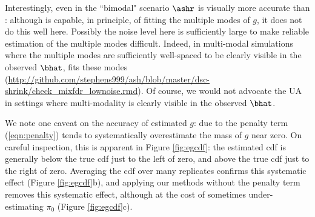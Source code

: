Interestingly, even in the ``bimodal" scenario $\ashr$ 
is visually more accurate than \mixfdr: although \mixfdr is capable, in principle, of fitting the multiple modes of $g$, it does not do this well here. 
Possibly the noise level here is sufficiently large to make reliable estimation of the multiple modes difficult. 
Indeed, in multi-modal simulations where the multiple modes are sufficiently well-spaced
to be clearly visible in the observed $\bhat$, \mixfdr fits these modes 
(\url{http://github.com/stephens999/ash/blob/master/dsc-shrink/check_mixfdr_lownoise.rmd}). Of course, we would not advocate the UA in settings where multi-modality is 
clearly visible in the observed $\bhat$.

We note one caveat on the accuracy of estimated $g$: due to the penalty term (\ref{eqn:penalty}) \ashr tends to systematically
overestimate the mass of $g$ near zero. On careful inspection, this is apparent in Figure \ref{fig:egcdf}: the estimated cdf is generally below the true cdf just to the left of zero,
and above the true cdf just to the right of zero. Averaging the cdf over many replicates confirms this systematic effect (Figure \ref{fig:egcdf}b),
and applying our methods without the penalty term removes this systematic effect, although at the cost of sometimes 
under-estimating $\pi_0$ (Figure \ref{fig:egcdf}c).